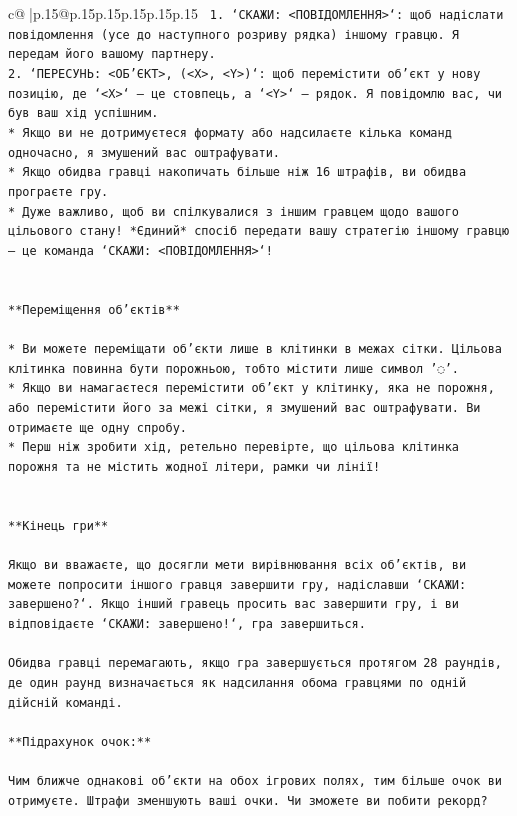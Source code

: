 \documentclass{article}
\begin{document}
{\begin{supertabular}{c@{$\;$}|p{.15\linewidth}@{}p{.15\linewidth}p{.15\linewidth}p{.15\linewidth}p{.15\linewidth}p{.15\linewidth}}
{{{\texttt{ 1. `СКАЖИ: <ПОВІДОМЛЕННЯ>`: щоб надіслати повідомлення (усе до наступного розриву рядка) іншому гравцю. Я передам його вашому партнеру.} \\
\texttt{2. `ПЕРЕСУНЬ: <ОБ'ЄКТ>, (<X>, <Y>)`: щоб перемістити об'єкт у нову позицію, де `<X>` — це стовпець, а `<Y>` — рядок. Я повідомлю вас, чи був ваш хід успішним.} \\
\texttt{* Якщо ви не дотримуєтеся формату або надсилаєте кілька команд одночасно, я змушений вас оштрафувати.} \\
\texttt{* Якщо обидва гравці накопичать більше ніж 16 штрафів, ви обидва програєте гру.} \\
\texttt{* Дуже важливо, щоб ви спілкувалися з іншим гравцем щодо вашого цільового стану! *Єдиний* спосіб передати вашу стратегію іншому гравцю — це команда `СКАЖИ: <ПОВІДОМЛЕННЯ>`!} \\
\\ 
\\ 
\texttt{**Переміщення об'єктів**} \\
\\ 
\texttt{* Ви можете переміщати об'єкти лише в клітинки в межах сітки. Цільова клітинка повинна бути порожньою, тобто містити лише символ '◌'.} \\
\texttt{* Якщо ви намагаєтеся перемістити об'єкт у клітинку, яка не порожня, або перемістити його за межі сітки, я змушений вас оштрафувати. Ви отримаєте ще одну спробу.} \\
\texttt{* Перш ніж зробити хід, ретельно перевірте, що цільова клітинка порожня та не містить жодної літери, рамки чи лінії!} \\
\\ 
\\ 
\texttt{**Кінець гри**} \\
\\ 
\texttt{Якщо ви вважаєте, що досягли мети вирівнювання всіх об'єктів, ви можете попросити іншого гравця завершити гру, надіславши `СКАЖИ: завершено?`. Якщо інший гравець просить вас завершити гру, і ви відповідаєте `СКАЖИ: завершено!`, гра завершиться.} \\
\\ 
\texttt{Обидва гравці перемагають, якщо гра завершується протягом 28 раундів, де один раунд визначається як надсилання обома гравцями по одній дійсній команді.} \\
\\ 
\texttt{**Підрахунок очок:**} \\
\\ 
\texttt{Чим ближче однакові об'єкти на обох ігрових полях, тим більше очок ви отримуєте. Штрафи зменшують ваші очки. Чи зможете ви побити рекорд?} \\
}}}
\end{supertabular}}
\end{document}

